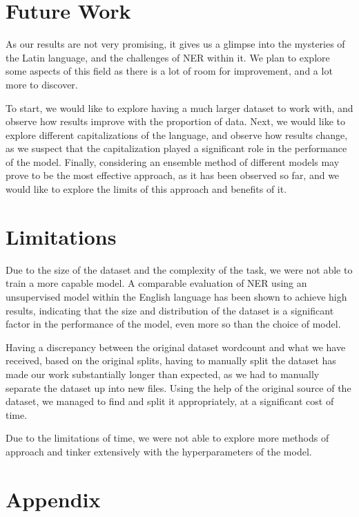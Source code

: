 \documentclass[11pt]{article}
\begin{document}
\section{Future Work}

As our results are not very promising, it gives us a glimpse into the mysteries of the Latin language, and the challenges of NER within it.
We plan to explore some aspects of this field as there is a lot of room for improvement, and a lot more to discover.

To start, we would like to explore having a much larger dataset to work with, and observe how results improve with the proportion of data.
Next, we would like to explore different capitalizations of the language, and observe how results change, as we
suspect that the capitalization played a significant role in the performance of the model.
Finally, considering an ensemble method of different models may prove to be the most effective approach, as it has been observed so far,
and we would like to explore the limits of this approach and benefits of it.

\newpage
\section*{Limitations}

Due to the size of the dataset and the complexity of the task, we were not able to train a more capable model.
A comparable evaluation of NER using an unsupervised model within the English language has been shown to achieve high results,
indicating that the size and distribution of the dataset is a significant factor in the performance of the model, even more so than the choice of model.

Having a discrepancy between the original dataset wordcount and what we have received, based on the original splits, having to
manually split the dataset has made our work substantially longer than expected, as we had to manually separate the dataset up into
new files. Using the help of the original source of the dataset, we managed to find and split it appropriately, at a significant cost of time.

Due to the limitations of time, we were not able to explore more methods of approach and tinker extensively with the hyperparameters of the model.

\appendix

\section{Appendix}
\label{sec:appendix}
\end{document}
